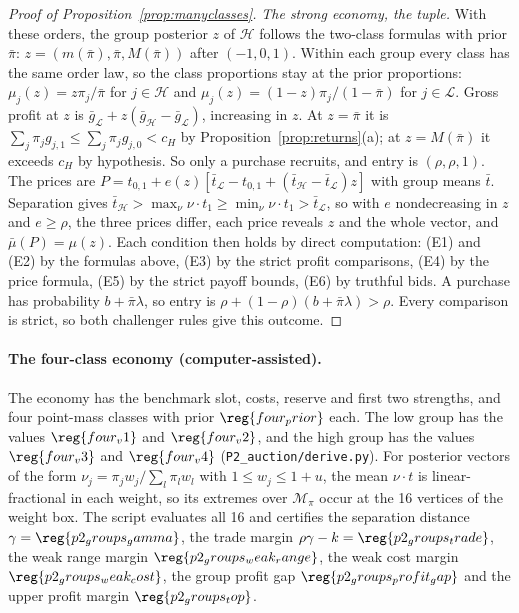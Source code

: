 \begin{proof}[Proof of Proposition~\ref{prop:manyclasses}]
\emph{The strong economy, the tuple.} With these orders, the group posterior \(z\) of \(\mathcal H\) follows the
two-class formulas with prior \(\bar\pi\): \(z=(m(\bar\pi),\bar\pi,M(\bar\pi))\) after \((-1,0,1)\). Within each
group every class has the same order law, so the class proportions stay at the prior proportions:
\(\mu_j(z)=z\pi_j/\bar\pi\) for \(j\in\mathcal H\) and \(\mu_j(z)=(1-z)\pi_j/(1-\bar\pi)\) for \(j\in\mathcal L\). Gross
profit at \(z\) is \(\bar g_{\mathcal L}+z(\bar g_{\mathcal H}-\bar g_{\mathcal L})\), increasing in \(z\). At
\(z=\bar\pi\) it is \(\sum_j\pi_jg_{j,1}\le\sum_j\pi_jg_{j,0}<c_H\) by Proposition~\ref{prop:returns}(a); at
\(z=M(\bar\pi)\) it exceeds \(c_H\) by hypothesis. So only a purchase recruits, and entry is \((\rho,\rho,1)\). The
prices are \(P=t_{0,1}+e(z)[\bar t_{\mathcal L}-t_{0,1}+(\bar t_{\mathcal H}-\bar t_{\mathcal L})z]\) with group means
\(\bar t\). Separation gives \(\bar t_{\mathcal H}>\max_{\nu}\nu\cdot t_1\ge\min_\nu\nu\cdot t_1>\bar t_{\mathcal L}\),
so with \(e\) nondecreasing in \(z\) and \(e\ge\rho\), the three prices differ, each price reveals \(z\) and the whole
vector, and \(\bar\mu(P)=\mu(z)\). Each condition then holds by direct computation: (E1) and (E2) by the formulas
above, (E3) by the strict profit comparisons, (E4) by the price formula, (E5) by the strict payoff bounds, (E6) by
truthful bids. A purchase has probability \(b+\bar\pi\lambda\), so entry is \(\rho+(1-\rho)(b+\bar\pi\lambda)>\rho\).
Every comparison is strict, so both challenger rules give this outcome.
\end{proof}

\paragraph{The four-class economy (computer-assisted).}
The economy has the benchmark slot, costs, reserve and first two strengths, and four point-mass classes with prior
\(\reg{four_prior}\) each. The low group has the values \(\reg{four_v1}\) and \(\reg{four_v2}\), and the high group has
the values \(\reg{four_v3}\) and \(\reg{four_v4}\) (\nolinkurl{P2_auction/derive.py}).
For posterior vectors of the form \(\nu_j=\pi_jw_j/\sum_l\pi_lw_l\) with \(1\le w_j\le1+u\), the mean \(\nu\cdot t\) is
linear-fractional in each weight, so its extremes over \(\mathcal M_\pi\) occur at the 16 vertices of the weight box.
The script evaluates all 16 and certifies the separation distance \(\gamma=\reg{p2_groups_gamma}\), the trade margin
\(\rho\gamma-k=\reg{p2_groups_trade}\), the weak range margin \(\reg{p2_groups_weak_range}\), the weak cost margin
\(\reg{p2_groups_weak_cost}\), the group profit gap \(\reg{p2_groups_profit_gap}\) and the upper profit margin
\(\reg{p2_groups_top}\).


